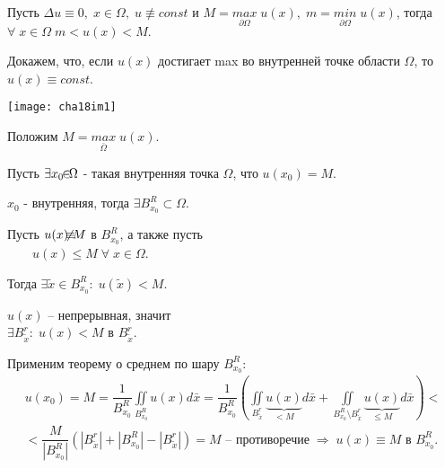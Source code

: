 \vspace{1cm}
\begin{theorem}
	Пусть $ \Delta u \equiv 0, \; x \in \Omega, \; u \not\equiv const$ и $M = \underset{\partial \Omega}{max}\;u(x), \; m = \underset{\partial \Omega}{min}\;u(x)$, тогда $\forall \; x \in \Omega \; m < u(x) < M.$
\end{theorem}
\begin{Proof}
	Докажем, что, если $ u(x) $ достигает max во внутренней точке области $ \Omega$, то $u(x) \equiv const$. 

	\begin{multicols}{2}
		\texttt{[image: cha18im1]}
		\columnbreak

		Положим $ M = \underset{\bar{\Omega}}{max}\;u(x) $. 

		Пусть $ \exists x_0 \hspace{-4pt} \in \hspace{-4pt} \Omega $ - такая внутренняя точка $ \Omega$, что $u(x_0) = M$.

		$x_0 $ - внутренняя, тогда $\exists B_{x_0}^R \subset \Omega$.

		Пусть $u(x) \hspace{-5pt}\not\equiv\hspace{-5pt} M $ в $ B_{x_0}^R$, а также пусть  \\$\;\;\;\;\;\;$ $u(x) \leq M \; \forall \; x \in \Omega$.

		Тогда $\exists \tilde{x} \in B_{x_0}^R: \; u(\tilde{x}) < M$.

		$u(x) $ -- непрерывная, значит \\$\exists B_{\tilde{x}}^r: \; u(x) < M $ в $ B_{\tilde{x}}^r$.
	\end{multicols}
	Применим теорему о среднем по шару $ B_{x_0}^R: $
	$$\begin{gathered}
		u(x_0) = M = \dfrac{1}{B_{x_0}^R} \iint \limits_{B_{x_0}^R}u(x)d\bar{x} = \dfrac{1}{B_{x_0}^R}\left( \iint \limits_{B_{\tilde{x}}^r}\underbrace{u(x)}_{< M}d\bar{x} + \iint \limits_{B_{x_0}^R \setminus B_{\tilde{x}}^r} \underbrace{u(x)}_{\leq M}d\bar{x}\right) < \\
		< \dfrac{M}{|B_{x_0}^R|} ( |B_{\tilde{x}}^r| + |B_{x_0}^R| - |B_{\tilde{x}}^r| ) = M \text{ -- противоречие} \; \Rightarrow \;  u(x) \equiv M \text{ в } B_{x_0}^R.
	\end{gathered}$$
\end{Proof}

